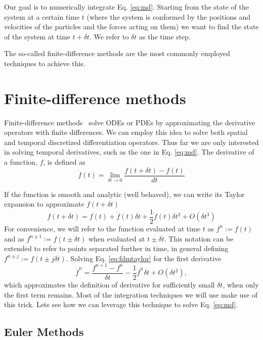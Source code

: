 \documentclass[twoside,openright,titlepage,numbers=noenddot,%
headinclude,footinclude,cleardoublepage=empty,abstract=on,
BCOR=5mm,fontsize=11pt, dvipsnames, paper=b5
]{scrreprt}
\newcommand{\dt}{\delta t}
\newcommand{\half}{\frac{1}{2}}
\begin{document}
Our goal is to numerically integrate Eq. \eqref{eq:md}. Starting from the state of the system at a certain time $t$ (where the system is conformed by the positions and velocities of the particles and the forces acting on them) we want to find the state of the system at time $t + \dt$. We refer to $\dt$ as the time step.

The so-called finite-difference methods are the most commonly employed techniques to achieve this.
\section{Finite-difference methods}
Finite-difference methods~\cite{Grossmann2007} solve \glspl{ODE} or \glspl{PDE} by approximating the derivative operators with finite differences.
We can employ this idea to solve both spatial and temporal discretized differentiation operators. Thus far we are only interested in solving temporal derivatives, such as the one in Eq. \eqref{eq:md}.
The derivative of a function, $f$, is defined as
\begin{equation}
  \dot{f}(t) = \lim_{\dt\rightarrow 0} \frac{f(t+\dt) - f(t)}{dt}
\end{equation}

If the function is smooth and analytic (well behaved), we can write its Taylor expansion to approximate $f(t+\dt)$
\begin{equation}
  \label{eq:fdmtaylor}
  f(t+\dt) = f(t)+\dot{f}(t)\dt + \half\ddot{f}(t)\dt^2 + O(\dt^3)
\end{equation}
For convenience, we will refer to the function evaluated at time $t$ as $f^n := f(t)$ and as $f^{n\pm 1} := f(t\pm \dt)$ when evaluated at $t\pm \dt$. This notation can be extended to refer to points separated further in time, in general defining $f^{n\pm j} := f(t\pm j\dt)$.
Solving Eq. \eqref{eq:fdmtaylor} for the first derivative
\begin{equation}
 \dot{f}^n  =  \frac{f^{n+1} - f^n}{\dt} - \half\ddot{f}^n\dt + O(\dt^2),
\end{equation}
which approximates the definition of derivative for sufficiently small $\dt$, when only the first term remains.
Most of the integration techniques we will use make use of this trick.
Lets see how we can leverage this technique to solve Eq. \eqref{eq:md}.
\subsection{Euler Methods}\label{sec:euler}
\end{document}
